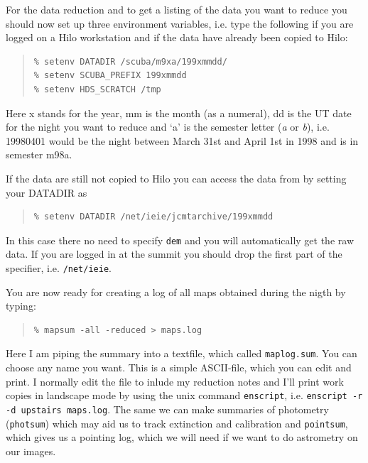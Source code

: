 \documentclass[twoside,11pt]{article}
\newenvironment{myquote}{\begin{quote}\begin{small}}{\end{small}\end{quote}}
\renewcommand{\_}{\texttt{\symbol{95}}}
\begin{document}
For the data reduction and to get a listing of the data you want to
reduce you should now set up three environment variables, i.e. type the
following if you are logged on a Hilo workstation and if the data have
already been copied to Hilo:

\begin{myquote}
\begin{verbatim}
% setenv DATADIR /scuba/m9xa/199xmmdd/
% setenv SCUBA_PREFIX 199xmmdd
% setenv HDS_SCRATCH /tmp
\end{verbatim} 
\end{myquote}

Here x stands for the year, mm is the month (as a numeral), dd is the UT
date for the night you want to reduce and `a' is the semester letter
(\textit{a} or \textit{b}), i.e. 19980401 would be the night 
between March 31st and April 1st in 1998 and is in semester m98a.

If the data are still not copied to Hilo you can access the data from by
setting your DATADIR as

\begin{myquote} 
\begin{verbatim}
% setenv DATADIR /net/ieie/jcmtarchive/199xmmdd
\end{verbatim} 
\end{myquote}


In this case there no need to specify \texttt{dem} and you will
automatically get the raw data. If you are logged in at the summit you
should drop the first part of the specifier, i.e. \texttt{/net/ieie}.

You are now ready for creating a log of all maps obtained during the nigth
by typing:

\begin{myquote}
\begin{verbatim}
% mapsum -all -reduced > maps.log
\end{verbatim} 
\end{myquote}

Here I am piping the summary into a textfile, which called
\texttt{maplog.sum}.  You can choose any name you want. This is a simple
ASCII-file, which you can edit and print. I normally edit the file to inlude
my reduction notes and I'll print work copies in landscape mode by using the
unix command \texttt{enscript}, i.e. \texttt{enscript -r -d upstairs
maps.log}. The same we can make summaries of photometry (\texttt{photsum})
which may aid us to track extinction and calibration and \texttt{pointsum},
which gives us a pointing log, which we will need if we want to do astrometry
on our images.
\end{document}
